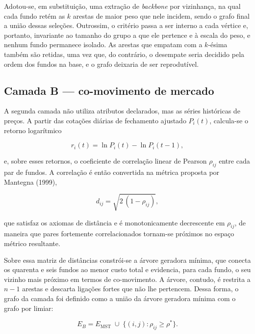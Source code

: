 Adotou-se, em substituição, uma extração de \textit{backbone} por vizinhança,
na qual cada fundo retém as $k$ arestas de maior peso que nele incidem, sendo
o grafo final a união dessas seleções. Outrossim, o critério passa a ser
interno a cada vértice e, portanto, invariante ao tamanho do grupo a que ele
pertence e à escala do peso, e nenhum fundo permanece isolado. As arestas que
empatam com a $k$-ésima também são retidas, uma vez que, do contrário, o
desempate seria decidido pela ordem dos fundos na base, e o grafo deixaria de
ser reprodutível.

\subsection{Camada B — co-movimento de mercado}

A segunda camada não utiliza atributos declarados, mas as séries históricas de
preços. A partir das cotações diárias de fechamento ajustado $P_i(t)$,
calcula-se o retorno logarítmico

\begin{equation}
  r_i(t) = \ln P_i(t) - \ln P_i(t-1),
\end{equation}

e, sobre esses retornos, o coeficiente de correlação linear de Pearson
$\rho_{ij}$ entre cada par de fundos. A correlação é então convertida na
métrica proposta por Mantegna (1999),

\begin{equation}
  d_{ij} = \sqrt{2\,(1 - \rho_{ij})},
\end{equation}

que satisfaz os axiomas de distância e é monotonicamente decrescente em
$\rho_{ij}$, de maneira que pares fortemente correlacionados tornam-se
próximos no espaço métrico resultante.

Sobre essa matriz de distâncias constrói-se a árvore geradora mínima, que
conecta os quarenta e seis fundos ao menor custo total e evidencia, para cada
fundo, o seu vizinho mais próximo em termos de co-movimento. A árvore,
contudo, é restrita a $n-1$ arestas e descarta ligações fortes que não lhe
pertencem. Dessa forma, o grafo da camada foi definido como a união da árvore
geradora mínima com o grafo por limiar:

\begin{equation}
  E_B = E_{\mathrm{MST}} \;\cup\; \{(i,j) : \rho_{ij} \geq \rho^{*}\}.
\end{equation}

